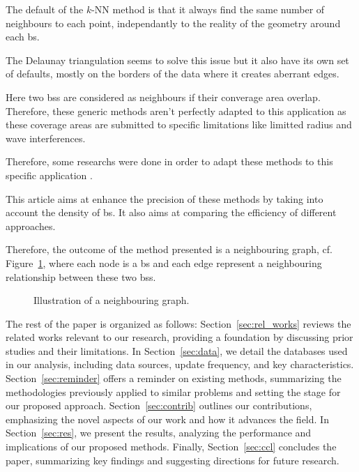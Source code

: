 \documentclass[lettersize,journal,english]{IEEEtran}
\begin{document}
    The default of the $k$-NN method is that it always find the same number of neighbours to each point, independantly to the reality of the geometry around each \acrshort{bs}.
    
    The Delaunay triangulation seems to solve this issue but it also have its own set of defaults, mostly on the borders of the data where it creates aberrant edges.

    Here two \acrshort{bs}s are considered as neighbours if their converage area overlap. Therefore, these generic methods aren't perfectly adapted to this application as these coverage areas are submitted to specific limitations like limitted radius and wave interferences.

    Therefore, some researchs were done in order to adapt these methods to this specific application \cite{patent_neighs}.

    This article aims at enhance the precision of these methods by taking into account the density of \acrshort{bs}. It also aims at comparing the efficiency of different approaches. 

    Therefore, the outcome of the method presented is a neighbouring graph, cf. Figure~\ref{fig:neigh_graph}, where each node is a \acrshort{bs} and each edge represent a neighbouring relationship between these two \acrshort{bs}s.
    \begin{figure}
        \centering
        \caption{Illustration of a neighbouring graph.}
        \label{fig:neigh_graph}
    \end{figure}

    The rest of the paper is organized as follows: Section~\ref{sec:rel_works} reviews the related works relevant to our research, providing a foundation by discussing prior studies and their limitations. In Section~\ref{sec:data}, we detail the databases used in our analysis, including data sources, update frequency, and key characteristics. Section~\ref{sec:reminder} offers a reminder on existing methods, summarizing the methodologies previously applied to similar problems and setting the stage for our proposed approach. Section~\ref{sec:contrib} outlines our contributions, emphasizing the novel aspects of our work and how it advances the field. In Section~\ref{sec:res}, we present the results, analyzing the performance and implications of our proposed methods. Finally, Section~\ref{sec:ccl} concludes the paper, summarizing key findings and suggesting directions for future research.
\end{document}
